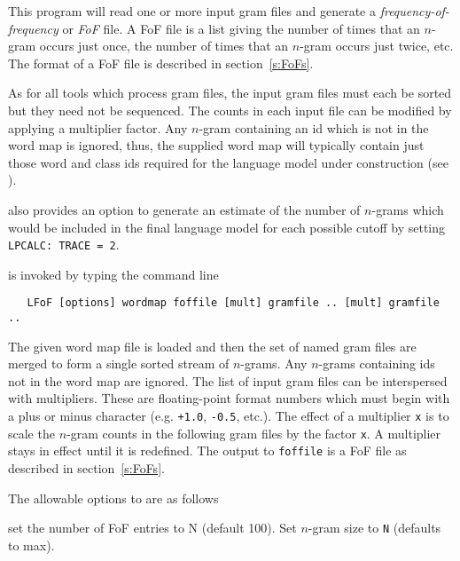 %
%
%

\newpage
{}


This program will read one or more input gram files and generate a
\textit{frequency-of-frequency} or \textit{FoF} file. A FoF file is a
list giving the number of times that an $n$-gram occurs just once, the
number of times that an $n$-gram occurs just twice, etc. The format of a
FoF file is described in section~\ref{s:FoFs}.

As for all tools which process gram files, the input gram files must
each be sorted but they need not be sequenced. The counts in each
input file can be modified by applying a multiplier factor.  Any $n$-gram
containing an id which is not in the word map is ignored, thus, the
supplied word map will typically contain just those word and class ids
required for the language model under construction (see
).

 also provides an option to generate an estimate
of the number of $n$-grams which would be included in the final language
model for each possible cutoff by setting \texttt{LPCALC: TRACE = 2}.


 is invoked by typing the command line
\begin{verbatim}
   LFoF [options] wordmap foffile [mult] gramfile .. [mult] gramfile ..
\end{verbatim}
The given word map file is loaded and then the set of named gram files
are merged to form a single sorted stream of $n$-grams. Any $n$-grams
containing ids not in the word map are ignored. The list of input gram
files can be interspersed with multipliers. These are floating-point
format numbers which must begin with a plus or minus character
(e.g. \texttt{+1.0}, \texttt{-0.5}, etc.). The effect of a multiplier
\texttt{x} is to scale the $n$-gram counts in the following gram files by
the factor \texttt{x}.  A multiplier stays in effect until it is
redefined.  The output to \texttt{foffile} is a FoF file as described
in section~\ref{s:FoFs}.

The allowable options to  are as follows

\begin{optlist}
   set the number of FoF entries to N (default 100).
   Set $n$-gram size to \texttt{N} (defaults to max).
\end{optlist}


